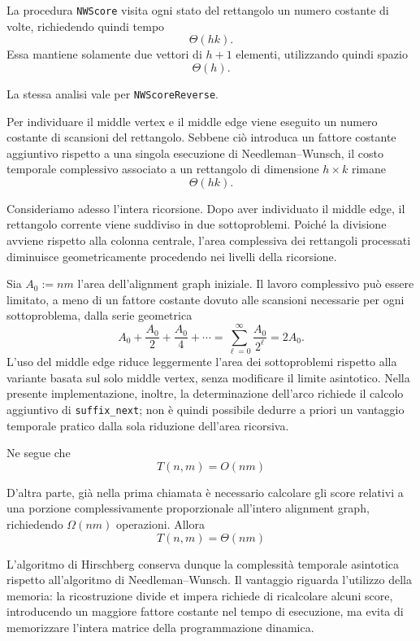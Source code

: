 La procedura \texttt{NWScore} visita ogni stato del rettangolo un numero costante di volte,
richiedendo quindi tempo
\[
    \Theta(hk).
\]
Essa mantiene solamente due vettori di $h+1$ elementi, utilizzando quindi spazio
\[
    \Theta(h).
\]

La stessa analisi vale per \texttt{NWScoreReverse}.

Per individuare il middle vertex e il middle edge viene eseguito un numero costante di scansioni del rettangolo.
Sebbene ciò introduca un fattore costante 
aggiuntivo rispetto a una singola esecuzione di Needleman--Wunsch, il costo temporale complessivo associato
a un rettangolo di dimensione $h  \times k$ rimane
\[
    \Theta(hk).
\]

Consideriamo adesso l'intera ricorsione.
Dopo aver individuato il middle edge, il rettangolo corrente viene suddiviso in due sottoproblemi.
Poiché la divisione avviene rispetto alla colonna centrale, l'area complessiva dei rettangoli processati
diminuisce geometricamente procedendo nei livelli della ricorsione.

Sia $A_{0}:=nm$ l'area dell'alignment graph iniziale. Il lavoro complessivo può essere limitato, a meno di un fattore
costante dovuto alle scansioni necessarie per ogni sottoproblema, dalla serie geometrica
\[
    A_{0} + \frac{A_{0}}{2} + \frac{A_{0}}{4} + \cdots = \sum^{\infty}_{\ell = 0}\frac{A_{0}}{2^{\ell}}=2 A_{0}.
\]
L'uso del middle edge riduce leggermente l'area dei sottoproblemi rispetto alla variante basata sul solo middle vertex,
senza modificare il limite asintotico. Nella presente implementazione, inoltre, la determinazione dell'arco richiede il calcolo
aggiuntivo di \texttt{suffix\_next}; non è quindi possibile dedurre a priori un vantaggio temporale pratico dalla sola riduzione dell'area ricorsiva.

Ne segue che
\[
    T(n,m) = O(nm)
\]

D'altra parte, già nella prima chiamata è necessario calcolare gli score relativi a una porzione complessivamente proporzionale all'intero
alignment graph, richiedendo $\Omega(nm)$ operazioni. Allora
\[
    T(n,m) = \Theta(nm)
\]

L'algoritmo di Hirschberg conserva dunque la complessità temporale asintotica rispetto all'algoritmo di Needleman--Wunsch.
Il vantaggio riguarda l'utilizzo della memoria: la ricostruzione divide et impera richiede di ricalcolare alcuni score,
introducendo un maggiore fattore costante nel tempo di esecuzione, ma evita di memorizzare l'intera matrice della programmazione dinamica.


